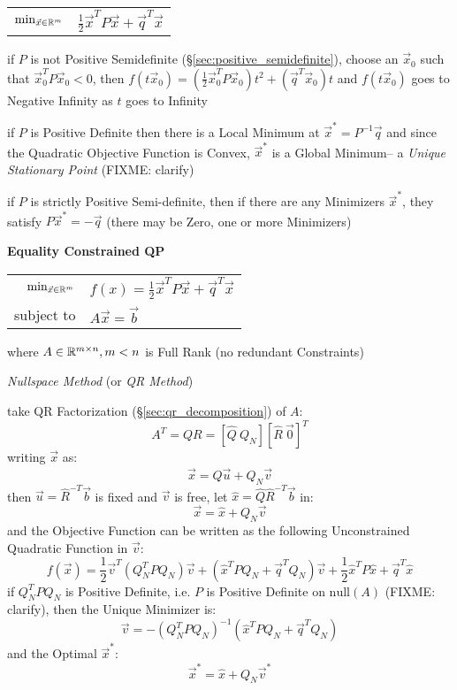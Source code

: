 \begin{tabular}{r l}
  $\mathrm{min}_{\vec{x} \in \mathbb{R}^m}$ &
    $\frac{1}{2}\vec{x}^T P\vec{x} + \vec{q}^T\vec{x}$ \\
\end{tabular}

if $P$ is not Positive Semidefinite (\S\ref{sec:positive_semidefinite}), choose
an $\vec{x}_0$ such that $\vec{x}_0^T P\vec{x}_0 < 0$, then
$f(t\vec{x}_0) = (\frac{1}{2}\vec{x}_0^TP\vec{x}_0)t^2 + (\vec{q}^T\vec{x}_0)t$
and $f(t\vec{x}_0)$ goes to Negative Infinity as $t$ goes to Infinity

if $P$ is Positive Definite then there is a Local Minimum at $\vec{x}^* =
P^{-1}\vec{q}$ and since the Quadratic Objective Function is Convex,
$\vec{x}^*$ is a Global Minimum-- a \emph{Unique Stationary Point} (FIXME:
clarify)

if $P$ is strictly Positive Semi-definite, then if there are any Minimizers
$\vec{x}^*$, they satisfy $P\vec{x}^* = - \vec{q}$ (there may be Zero, one or
more Minimizers)


\textbf{Equality Constrained QP}

\begin{tabular}{r l}
  $\mathrm{min}_{\vec{x} \in \mathbb{R}^m}$ &
    $f(x) = \frac{1}{2}\vec{x}^T P\vec{x} + \vec{q}^T\vec{x}$ \\
  subject to & $A\vec{x} = \vec{b}$ \\
\end{tabular}

where $A \in \mathbb{R}^{m \times n}, m < n$ is Full Rank (no redundant
Constraints)

\emph{Nullspace Method} (or \emph{QR Method})

take QR Factorization (\S\ref{sec:qr_decomposition}) of $A$:
\[
  A^T = QR = [\hat{Q} \ Q_N] [\hat{R} \ \vec{0}]^T
\]
writing $\vec{x}$ as:
\[
  \vec{x} = \hat{Q}\vec{u} + Q_N\vec{v}
\]
then $\vec{u} = \hat{R}^{-T}\vec{b}$ is fixed and $\vec{v}$ is free,
let $\hat{x} = \hat{Q}\hat{R}^{-T}\vec{b}$ in:
\[
  \vec{x} = \hat{x} + Q_N\vec{v}
\]
and the Objective Function can be written as the following Unconstrained
Quadratic Function in $\vec{v}$:
\[
  f(\vec{x}) = \frac{1}{2}\vec{v}^T(Q_N^T P Q_N)\vec{v} +
    (\hat{x}^T PQ_N + \vec{q}^T Q_N)\vec{v} +
    \frac{1}{2}\hat{x}^T P\hat{x} + \vec{q}^T\hat{x}
\]
if $Q_N^T P Q_N$ is Positive Definite, i.e. $P$ is Positive Definite on
$\mathrm{null}(A)$ (FIXME: clarify), then the Unique Minimizer is:
\[
  \vec{v} = -(Q_N^T P Q_N)^{-1}(\hat{x}^T P Q_N + \vec{q}^T Q_N)
\]
and the Optimal $\vec{x}^*$:
\[
  \vec{x}^* = \hat{x} + Q_N\vec{v}^*
\]


